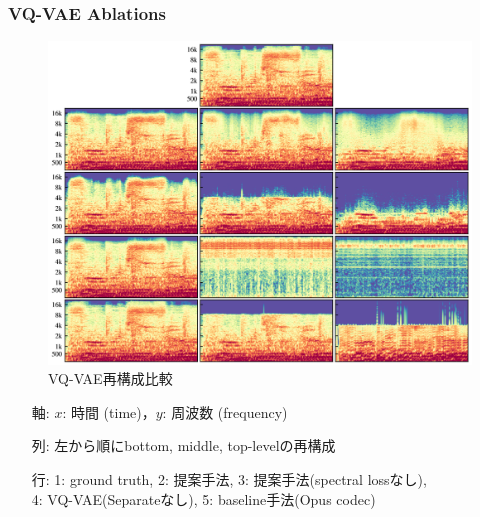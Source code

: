 \documentclass[dvipdfmx]{beamer}
\begin{document}
\begin{frame}
    \frametitle{VQ-VAE Ablations}
    \begin{figure}
        \begin{center}
            \includegraphics[scale=0.15]{figure/vqvaeablations.png}
            \vspace{-0.5\baselineskip}
            \caption{VQ-VAE再構成比較}
        \end{center}
    \end{figure}
    \begin{itemize}
        \item[軸:] $x$: 時間 (time)，$y$: 周波数 (frequency)
        \item[列:] 左から順にbottom, middle, top-levelの再構成
        \item[行:] 1: ground truth, 2: 提案手法, 3: 提案手法(spectral lossなし),\\
        4: VQ-VAE(Separateなし), 5: baseline手法(Opus codec)
    \end{itemize}
\end{frame}
\end{document}
